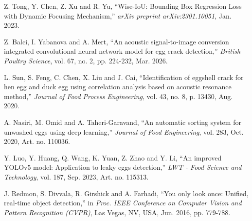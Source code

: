 \documentclass[12pt,a4paper]{report}
\begin{document}
\begin{enumerate}[label={[\arabic*]}]
\item Z. Tong, Y. Chen, Z. Xu and R. Yu,
``Wise-IoU: Bounding Box Regression Loss with Dynamic Focusing Mechanism,''
\textit{arXiv preprint arXiv:2301.10051}, Jan. 2023.

\item Z. Balci, I. Yabanova and A. Mert,
``An acoustic signal-to-image conversion integrated convolutional neural network model for egg crack detection,''
\textit{British Poultry Science}, vol. 67, no. 2, pp. 224-232, Mar. 2026.

\item L. Sun, S. Feng, C. Chen, X. Liu and J. Cai,
``Identification of eggshell crack for hen egg and duck egg using correlation analysis based on acoustic resonance method,''
\textit{Journal of Food Process Engineering}, vol. 43, no. 8, p. 13430, Aug. 2020.

\item A. Nasiri, M. Omid and A. Taheri-Garavand,
``An automatic sorting system for unwashed eggs using deep learning,''
\textit{Journal of Food Engineering}, vol. 283, Oct. 2020, Art. no. 110036.

\item Y. Luo, Y. Huang, Q. Wang, K. Yuan, Z. Zhao and Y. Li,
``An improved YOLOv5 model: Application to leaky eggs detection,''
\textit{LWT - Food Science and Technology}, vol. 187, Sep. 2023, Art. no. 115313.

\item J. Redmon, S. Divvala, R. Girshick and A. Farhadi,
``You only look once: Unified, real-time object detection,''
in \textit{Proc. IEEE Conference on Computer Vision and Pattern Recognition (CVPR)}, Las Vegas, NV, USA, Jun. 2016, pp. 779-788.

\end{enumerate}
\end{document}
